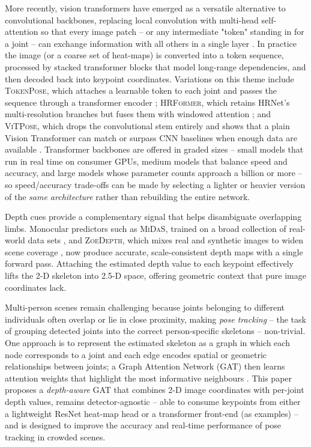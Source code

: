 More recently, vision transformers have emerged as a versatile alternative to
convolutional backbones, replacing local convolution with multi-head
self-attention so that every image patch -- or any intermediate "token" standing
in for a joint -- can exchange information with all others in a single layer
\cite{vaswani2017attention}. In practice the image (or a coarse set of
heat-maps) is converted into a token sequence, processed by stacked transformer
blocks that model long-range dependencies, and then decoded back into keypoint
coordinates. Variations on this theme include \textsc{TokenPose}, which
attaches a learnable token to each joint and passes the sequence through a
transformer encoder \cite{li2021tokenpose}; \textsc{HRFormer}, which retains
HRNet's multi-resolution branches but fuses them with windowed attention
\cite{yuan2021hrformer}; and \textsc{ViTPose}, which drops the convolutional
stem entirely and shows that a plain Vision Transformer can match or surpass
CNN baselines when enough data are available \cite{xu2022vitpose}. Transformer
backbones are offered in graded sizes -- small models that run in real time on
consumer GPUs, medium models that balance speed and accuracy, and large models
whose parameter counts approach a billion or more -- so speed/accuracy trade-offs
can be made by selecting a lighter or heavier version of the \emph{same
architecture} rather than rebuilding the entire network.

Depth cues provide a complementary signal that helps disambiguate overlapping
limbs. Monocular predictors such as \textsc{MiDaS}, trained on a broad
collection of real-world data sets \cite{ranftl2021robust,ranftl2022dense}, and
\textsc{ZoeDepth}, which mixes real and synthetic images to widen scene
coverage \cite{khattak2023zoedepth}, now produce accurate, scale-consistent
depth maps with a single forward pass. Attaching the estimated depth value to
each keypoint effectively lifts the 2-D skeleton into 2.5-D space, offering
geometric context that pure image coordinates lack.

Multi-person scenes remain challenging because joints belonging to different
individuals often overlap or lie in close proximity, making \emph{pose
tracking} -- the task of grouping detected joints into the correct person-specific
skeletons -- non-trivial. One approach is to represent the estimated skeleton as a
graph in which each node corresponds to a joint and each edge encodes spatial
or geometric relationships between joints; a Graph Attention Network (GAT) then
learns attention weights that highlight the most informative neighbours
\cite{velivckovic2017graph}. This paper proposes a \emph{depth-aware} GAT that
combines 2-D image coordinates with per-joint depth values, remains
detector-agnostic -- able to consume keypoints from either a lightweight ResNet
heat-map head or a transformer front-end (as examples) -- and is designed to
improve the accuracy and real-time performance of pose tracking in crowded
scenes.